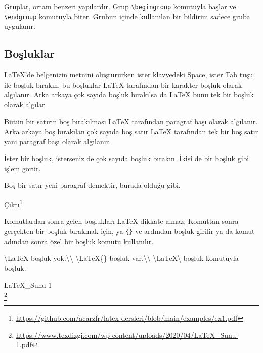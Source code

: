 \documentclass[
  10pt,
]{scrbook}
\newenvironment{Shaded}{\begin{snugshade}}{\end{snugshade}}
\newcommand{\NormalTok}[1]{#1}
\renewcommand{\href}[2]{#2\footnote{\url{#1}}}
\begin{document}
Gruplar, ortam benzeri yapılardır. Grup \texttt{\textbackslash{}begingroup} komutuyla başlar
ve \texttt{\textbackslash{}endgroup} komutuyla biter. Grubun içinde kullanılan bir bildirim
sadece gruba uygulanır.

\hypertarget{boux15fluklar}{%
\subsection{Boşluklar}\label{boux15fluklar}}

LaTeX'de belgenizin metnini oluştururken ister klavyedeki Space, ister
Tab tuşu ile boşluk bırakın, bu boşluklar LaTeX tarafından bir karakter
boşluk olarak algılanır. Arka arkaya çok sayıda boşluk bırakılsa da
LaTeX bunu tek bir boşluk olarak algılar.

Bütün bir satırın boş bırakılması LaTeX tarafından paragraf başı olarak
algılanır. Arka arkaya boş bırakılan çok sayıda boş satır LaTeX
tarafından tek bir boş satır yani paragraf başı olarak algılanır.

\begin{Shaded}
\begin{Highlighting}[]
\NormalTok{ İster bir boşluk, isterseniz de çok         sayıda boşluk bırakın. }
\NormalTok{İkisi de bir boşluk gibi işlem görür. }

\NormalTok{Boş bir satır yeni paragraf demektir, burada olduğu gibi.}
\end{Highlighting}
\end{Shaded}

\href{https://github.com/acarzfr/latex-dersleri/blob/main/examples/ex1.pdf}{Çıktı}

Komutlardan sonra gelen boşlukları LaTeX dikkate almaz. Komuttan sonra
gerçekten bir boşluk bırakmak için, ya \texttt{\{\}} ve ardından boşluk girilir
ya da komut adından sonra özel bir boşluk komutu kullanılır.

\begin{Shaded}
\begin{Highlighting}[]
\NormalTok{\textbackslash{}LaTeX  boşluk yok.\textbackslash{}\textbackslash{}}
\NormalTok{\textbackslash{}LaTeX\{\} boşluk var.\textbackslash{}\textbackslash{}}
\NormalTok{\textbackslash{}LaTeX\textbackslash{} boşluk komutuyla  boşluk.}
\end{Highlighting}
\end{Shaded}

\href{https://www.texdizgi.com/wp-content/uploads/2020/04/LaTeX_Sunu-1.pdf}{LaTeX\_Sunu-1\\
}
\end{document}
